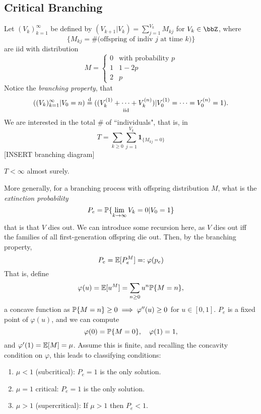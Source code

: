\documentclass[../../../Master/AppliedStochastics.tex]{subfiles}
\author{Isaac}
\date{21 November 2018}
\begin{document}
%


\makelecture


\subsection{Critical Branching}


\begin{definition}

Let $(V_k)_{k=1} ^\infty$ be defined by $(V_{k+1} | V_k) = \sum_{j=1} ^{V_k} 
M_{kj}$ for $V_k \in \bbZ$, where 
$$
\{ M_{kj} = \# \text{(offspring of indiv $j$ at time $k$)} \} 
$$
are iid with distribution 
$$
M = 
\begin{cases}
0 & \text{with probability $p$} \\
1 & 1 - 2p\\
2 & p
\end{cases}
$$
Notice the \emph{branching property}, that
$$
( (V_k)_{k=1} ^\infty | V_0 = n ) \disteq ( ( \underset{ \text{iid} }{ V_k 
^{(1)} + \cdots + V_k ^{(n)}} ) | V_0 ^{(1)} = \cdots = V_0 ^{(n)} = 1).
$$
We are interested in the total \# of ``individuals", that is, in 
$$
T = \sum_{k \geq 0} \sum_{j=1} ^{V_k} \mathbf{1}_{ \{ M_{kj} = 0 \} }
$$ 
[INSERT branching diagram]


\end{definition}


\begin{lemma}
$T < \infty$ almost surely.
\end{lemma}

More generally, for a branching process with offspring distribution $M$, what 
is the \emph{extinction probability}
$$
P_e = \P \{ \lim_{k \to \infty} V_k = 0 | V_0 = 1 \}
$$
that is that $V$ dies out. We can introduce some recursion here, as $V$ dies 
out iff the families of all first-generation offspring die out. Then, by the 
branching property, 
$$
P_e = \E [P_e^M] =: \varphi ( p_e)
$$
That is, define 
$$
\varphi (u) = \E [u^M] = \sum_{n \geq 0} u^n \P \{ M=n \},
$$
a concave function as $ \P \{ M=n \} \geq 0 \implies \varphi '' (u) \geq 0$ for 
$u \in [0,1]$. $P_e$ is a fixed point of $\varphi(u)$, and we can compute 
$$
\varphi (0) = \P \{ M = 0 \}, \quad \varphi (1) = 1,
$$
and $\varphi' (1) = \E [ M ] = \mu$. Assume this is finite, and recalling the 
concavity condition on $\varphi$, this leads to classifying conditions:

\begin{enumerate}
\item $\mu < 1$ (subcritical): $P_e = 1$ is the only solution.
\item $\mu = 1$ critical: $P_e = 1$ is the only solution.
\item $\mu > 1$ (supercritical): If $\mu > 1$ then $P_e < 1$. 
\end{enumerate}
\end{document}
